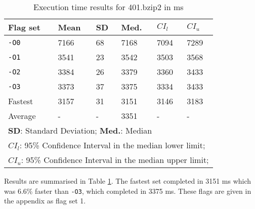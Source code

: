 \documentclass[twocolumn, 10pt]{article}
\begin{document}
\begin{table}[H]
    \centering
    \begin{tabular}{llllll}
        \toprule
        Flag set & Mean & SD & Med. & $CI_{l}$ & $CI_{u}$ \\
        \midrule
        \texttt{-O0} &7166&68&7168&7094&7289 \\
        \texttt{-O1} &3541&23&3542&3503&3568 \\
        \texttt{-O2} &3384&26&3379&3360&3433 \\
        \texttt{-O3} &3373&37&3375&3334&3433 \\
        Fastest &3157&31&3151&3146&3183 \\
        Average &-&-&3351&-&- \\
        \bottomrule
        \multicolumn{6}{l}{\footnotesize\textbf{SD}: Standard Deviation; \textbf{Med.}: Median}\\
        \multicolumn{6}{l}{\footnotesize\textbf{$CI_{l}$}: 95\% Confidence Interval in the median lower limit;}\\
        \multicolumn{6}{l}{\footnotesize\textbf{$CI_{u}$}: 95\% Confidence Interval in the median upper limit;}\\
    \end{tabular}
    \caption{Execution time results for 401.bzip2 in ms}

    \label{tab:bzip2}
\end{table}

Results are summarised in Table \ref{tab:bzip2}.
The fastest set completed in 3151 ms which was 6.6\% faster than \texttt{-O3}, which completed in 3375 ms.
These flags are given in the appendix as flag set 1.
\end{document}
